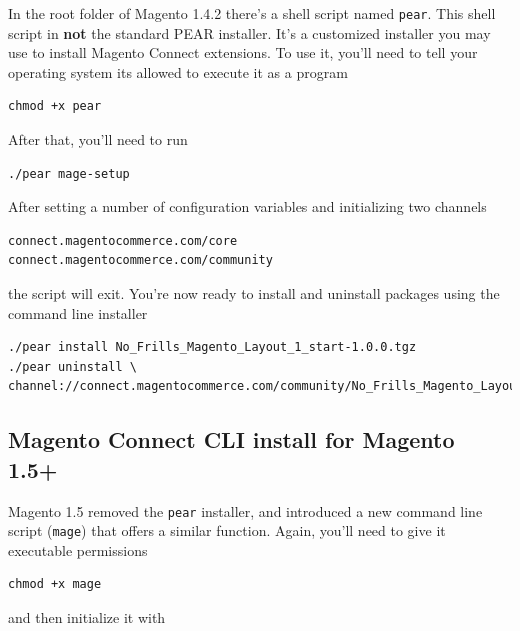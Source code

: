 \documentclass[oneside]{book}
\begin{document}
In the root folder of Magento 1.4.2 there's a shell script named \footnotesize\texttt{pear}\normalsize.  This shell script in \textbf{not} the standard PEAR installer.  It's a customized installer you may use to install Magento Connect extensions.  To use it, you'll need to tell your operating system its allowed to execute it as a program

\begin{lstlisting}
chmod +x pear

\end{lstlisting}


After that, you'll need to run

\begin{lstlisting}
./pear mage-setup

\end{lstlisting}


After setting a number of configuration variables and initializing two channels

\begin{lstlisting}
connect.magentocommerce.com/core
connect.magentocommerce.com/community

\end{lstlisting}


the script will exit.  You're now ready to install and uninstall packages using the command line installer

\begin{lstlisting}
./pear install No_Frills_Magento_Layout_1_start-1.0.0.tgz
./pear uninstall \
channel://connect.magentocommerce.com/community/No_Frills_Magento_Layout_1_sta...

\end{lstlisting}


\subsection{Magento Connect CLI install for Magento 1.5+}

Magento 1.5 removed the \footnotesize\texttt{pear} \normalsize  installer, and introduced a new command line script (\footnotesize\texttt{mage}\normalsize) that offers a similar function.  Again, you'll need to give it executable permissions

\begin{lstlisting}
chmod +x mage

\end{lstlisting}


and then initialize it with
\end{document}
